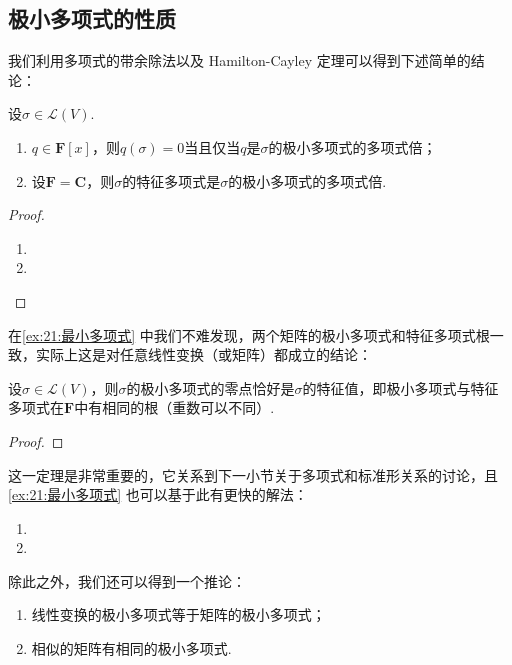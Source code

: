 \subsection{极小多项式的性质}
我们利用多项式的带余除法以及 Hamilton-Cayley 定理可以得到下述简单的结论：
\begin{theorem}
    设$\sigma\in \mathcal{L}(V)$.
    \begin{enumerate}
        \item $q\in\mathbf{F}[x]$，则$q(\sigma)=0$当且仅当$q$是$\sigma$的极小多项式的多项式倍；

        \item 设$\mathbf{F}=\mathbf{C}$，则$\sigma$的特征多项式是$\sigma$的极小多项式的多项式倍.
    \end{enumerate}
\end{theorem}

\begin{proof}
    \begin{enumerate}
        \item

        \item
    \end{enumerate}
\end{proof}

在\autoref{ex:21:最小多项式} 中我们不难发现，两个矩阵的极小多项式和特征多项式根一致，实际上这是对任意线性变换（或矩阵）都成立的结论：
\begin{theorem} \label{thm:21:极小多项式与特征多项式相同根}
    设$\sigma\in \mathcal{L}(V)$，则$\sigma$的极小多项式的零点恰好是$\sigma$的特征值，即极小多项式与特征多项式在$\mathbf{F}$中有相同的根（重数可以不同）.
\end{theorem}

\begin{proof}

\end{proof}

这一定理是非常重要的，它关系到下一小节关于多项式和标准形关系的讨论，且\autoref{ex:21:最小多项式} 也可以基于此有更快的解法：

\begin{solution}
    \begin{enumerate}
        \item

        \item
    \end{enumerate}
\end{solution}

除此之外，我们还可以得到一个推论：
\begin{corollary}
    \begin{enumerate}
        \item 线性变换的极小多项式等于矩阵的极小多项式；
        \item 相似的矩阵有相同的极小多项式.
    \end{enumerate}
\end{corollary}

